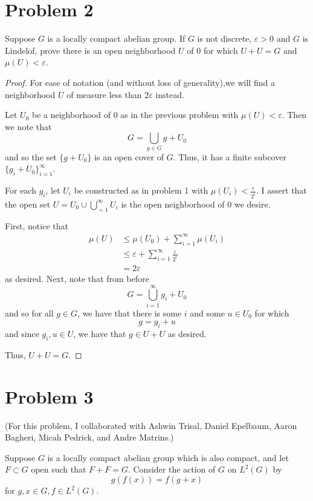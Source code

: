 \documentclass[fontsize=11pt]{scrartcl} %
\numberwithin{equation}{section} %
\numberwithin{figure}{section} %
\numberwithin{table}{section} %
\begin{document}
\section*{Problem 2}
Suppose $G$ is a locally compact abelian group. If $G$ is not discrete,
$\varepsilon>0$ and $G$ is Lindelof, prove there is an open neighborhood $U$ of
$0$ for which $U+U=G$ and $\mu(U)<\varepsilon$.

\begin{proof}
    For ease of notation (and without loss of generality),we will find a
    neighborhood $U$ of measure less than $2\varepsilon$ instead.

    Let $U_0$ be a neighborhood of $0$ as in the previous problem with
    $\mu(U)<\varepsilon$. Then we note that
    \[
        G = \bigcup_{g\in G} g+U_0
    \]
    and so the set $\{g+U_0\}$ is an open cover of $G$. Thus, it has a finite
    subcover $\{g_i +U_0\}_{i=1}^{\infty}$.

    For each $g_i$, let $U_i$ be constructed as in problem 1 with
    $\mu(U_i)<\frac{\varepsilon}{2^{i}}$. I assert that the open set $U =
    U_0\cup\bigcup_{=1}^{\infty}U_i$ is the open neighborhood of $0$ we desire.

    First, notice that
    \[
        \begin{aligned}
            \mu(U)&\leq \mu(U_0) + \sum_{i=1}^{\infty}\mu(U_i)\\
            &\leq \varepsilon + \sum_{i=1}^{\infty}\frac{\varepsilon}{2^i}\\
            &= 2\varepsilon
        \end{aligned}
    \]
    as desired. Next, note that from before
    \[
        G = \bigcup_{i=1}^{\infty}g_i + U_0
    \]
    and so for all $g\in G$, we have that there is some $i$ and some $u\in U_0$
    for which
    \[
        g = g_i + u
    \]
    and since $g_i,u\in U$, we have that $g\in U+U$ as desired.

    Thus, $U+U=G$.
\end{proof}

\newpage

\section*{Problem 3}
    (For this problem, I collaborated with Ashwin Trisal, Daniel Epelbaum,
    Aaron Bagheri, Micah Pedrick, and Andre Matrins.)

Suppose $G$ is a locally compact abelian group which is also compact, and let
$F\subset G$ open such that $F+F=G$. Consider the action of $G$ on $L^2(G)$ by
\[
    g(f(x)) = f(g+x)
\]
for $g,x\in G, f\in L^2(G)$.
\end{document}
